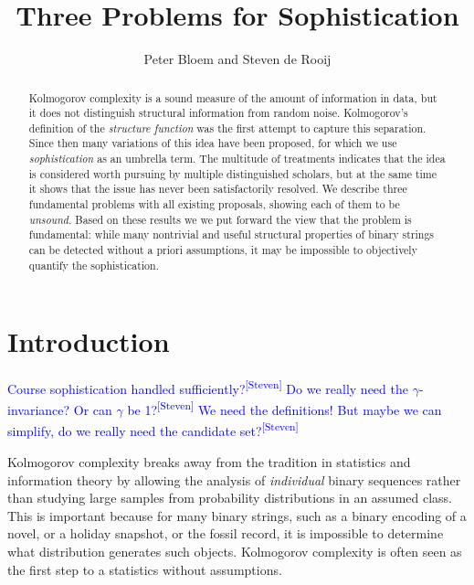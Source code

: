 \documentclass{style/llncs}
\title{Three Problems for Sophistication}
\author{Peter Bloem and Steven de Rooij}
\institute{
  System and Network Engineering Group, \\University of Amsterdam, the Netherlands\\
  \email{uva@peterbloem.nl, steven.de.rooij@gmail.com}
}
\newcommand{\sdr}[1]{\textcolor{blue}{\small #1\textsuperscript{[Steven]} }}
\begin{document}
\maketitle

\begin{abstract}
Kolmogorov complexity is a sound measure of the amount of information in data, but it does not distinguish structural information from random noise. Kolmogorov's definition of the \emph{structure function} was the first attempt to capture this separation. Since then many variations of this idea have been proposed, for which we use \emph{sophistication} as an umbrella term. The multitude of treatments indicates that the idea is considered worth pursuing by multiple distinguished scholars, but at the same time it shows that the issue has never been satisfactorily resolved. We describe three fundamental problems with all existing proposals, showing each of them to be \emph{unsound}. Based on these results we we put forward the view that the problem is fundamental: while many nontrivial and useful structural properties of binary strings can be detected without a priori assumptions, it may be impossible to objectively quantify the sophistication.
\end{abstract}

\section{Introduction}

\sdr{Course sophistication handled sufficiently?}
\sdr{Do we really need the $\gamma$-invariance? Or can $\gamma$ be 1?}
\sdr{We need the definitions! But maybe we can simplify, do we really need the candidate set?}

Kolmogorov complexity breaks away from the tradition in statistics and information theory by allowing the analysis of \emph{individual} binary sequences rather than studying large samples from probability distributions in an assumed class. This is important because for many binary strings, such as a binary encoding of a novel, or a holiday snapshot, or the fossil record, it is impossible to determine what distribution generates such objects. Kolmogorov complexity is often seen as the first step to a statistics without assumptions.
\end{document}
